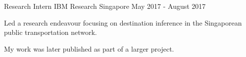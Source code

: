 \begin{cventries}
    \cventry
    {Research Intern} %
    {IBM Research} %
    {Singapore} %
    {May 2017 - August 2017} %
    {
        \begin{cvitems} %
            \item Led a research endeavour focusing on destination inference in the Singaporean public transportation network.
            \item My work was later published as part of a larger project.
        \end{cvitems}
    }
\end{cventries}
